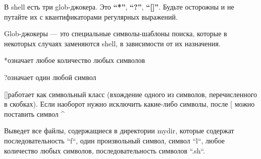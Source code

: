 В shell есть три glob-джокера. Это \textbf{“*”}, \textbf{“?”}, \textbf{“[]”}. Будьте осторожны и не путайте их с квантификаторами регулярных выражений. 

Glob-джокеры --- это специальные символы-шаблоны поиска, которые в некоторых случаях заменяются shell, в зависимости от их назначения. 

\begin{myenv}{*}{означает любое количество любых символов}
\end{myenv}
\begin{myenv}{?}{означает один любой символ}
\end{myenv}
\begin{myenv}{[]}{работает как символьный класс (вхождение одного из символов, перечисленного в скобках). Если наоборот нужно исключить какие-либо символы, после [ можно поставить символ \textasciicircum}
\end{myenv}


Выведет все файлы, содержащиеся в директории mydir, которые содержат последовательность “f“, один произвольный символ, символ “l“, любое количество любых символов, последовательность символов “.sh“.
